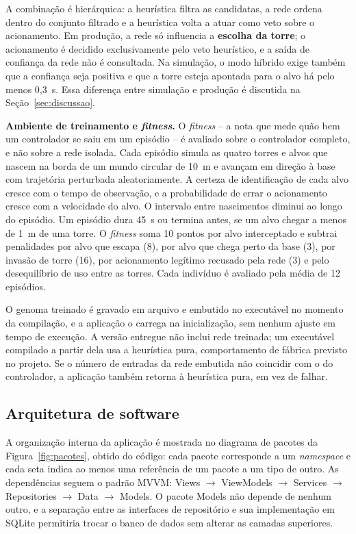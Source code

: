 \documentclass[12pt,a4paper]{article}
\begin{document}
A combinação é hierárquica: a heurística filtra as candidatas, a rede ordena dentro do conjunto
filtrado e a heurística volta a atuar como veto sobre o acionamento. Em produção, a rede só
influencia a \textbf{escolha da torre}; o acionamento é decidido exclusivamente pelo veto
heurístico, e a saída de confiança da rede não é consultada. Na simulação, o modo híbrido exige
também que a confiança seja positiva e que a torre esteja apontada para o alvo há pelo menos 0,3~s.
Essa diferença entre simulação e produção é discutida na Seção~\ref{sec:discussao}.

\textbf{Ambiente de treinamento e \textit{fitness}.} O \textit{fitness} -- a nota que mede quão bem
um controlador se saiu em um episódio -- é avaliado sobre o controlador completo, e não sobre a rede
isolada. Cada episódio simula as quatro torres e alvos que nascem na borda de um mundo circular de
10~m e avançam em direção à base com trajetória perturbada aleatoriamente. A certeza de
identificação de cada alvo cresce com o tempo de observação, e a probabilidade de errar o
acionamento cresce com a velocidade do alvo. O intervalo entre nascimentos diminui ao longo do
episódio. Um episódio dura 45~s ou termina
antes, se um alvo chegar a menos de 1~m de uma torre. O \textit{fitness} soma 10 pontos por alvo
interceptado e subtrai penalidades por alvo que escapa (8), por alvo que chega perto da base (3), por
invasão de torre (16), por acionamento legítimo recusado pela rede (3) e pelo desequilíbrio de uso
entre as torres. Cada indivíduo é avaliado pela média de 12 episódios.

O genoma treinado é gravado em arquivo e embutido no executável no momento da compilação, e a
aplicação o carrega na inicialização, sem nenhum ajuste em tempo de execução. A versão entregue
não inclui rede treinada; um executável compilado a partir dela usa a heurística pura,
comportamento de fábrica previsto no projeto. Se o número de entradas da rede
embutida não coincidir com o do controlador, a aplicação também retorna à heurística pura, em vez de
falhar.

\subsection{Arquitetura de software}
\label{sec:arquitetura}

A organização interna da aplicação é mostrada no diagrama de pacotes da
Figura~\ref{fig:pacotes}, obtido do código: cada pacote corresponde a um \textit{namespace} e cada
seta indica ao menos uma referência de um pacote a um tipo de outro. As dependências seguem o padrão
MVVM: Views $\rightarrow$ ViewModels $\rightarrow$ Services $\rightarrow$ Repositories $\rightarrow$
Data $\rightarrow$ Models. O pacote Models não depende de nenhum outro, e a separação entre as
interfaces de repositório e sua implementação em SQLite permitiria trocar o banco de dados sem
alterar as camadas superiores.
\end{document}
